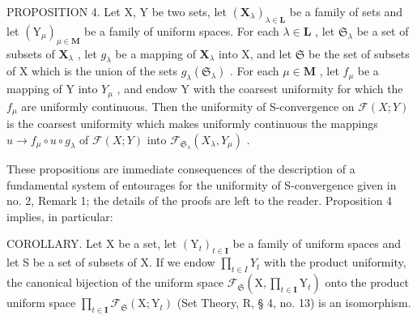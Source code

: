 PROPOSITION 4. Let X, Y be two sets, let \((\mathbf{X}_{\lambda})_{\lambda \in \mathbf{L}}\) be a family of sets and let \((\mathrm{Y}_{\mu})_{\mu \in \mathbf{M}}\) be a family of uniform spaces. For each \(\lambda \in \mathbf{L}\) , let \(\mathfrak{S}_{\lambda}\) be a set of subsets of \(\mathbf{X}_{\lambda}\) , let \(g_{\lambda}\) be a mapping of \(\mathbf{X}_{\lambda}\) into X, and let \(\mathfrak{S}\) be the set of subsets of X which is the union of the sets \(g_{\lambda}(\mathfrak{S}_{\lambda})\) . For each \(\mu \in \mathbf{M}\) , let \(f_{\mu}\) be a mapping of Y into \(Y_{\mu}\) , and endow Y with the coarsest uniformity for which the \(f_{\mu}\) are uniformly continuous. Then the uniformity of S-convergence on \(\mathcal{F}(X;Y)\) is the coarsest uniformity which makes uniformly continuous the mappings \(u \to f_{\mu} \circ u \circ g_{\lambda}\) of \(\mathcal{F}(X;Y)\) into \(\mathcal{F}_{\mathfrak{S}_{\lambda}}(X_{\lambda},Y_{\mu})\) .

These propositions are immediate consequences of the description of a fundamental system of entourages for the uniformity of S-convergence given in no. 2, Remark 1; the details of the proofs are left to the reader. Proposition 4 implies, in particular:

COROLLARY. Let X be a set, let \((\mathrm{Y}_{t})_{t\in\mathbf{I}}\) be a family of uniform spaces and let S be a set of subsets of X. If we endow \(\prod_{t\in I}Y_{t}\) with the product uniformity, the canonical bijection of the uniform space \(\mathcal{F}_{\mathfrak{S}}\left(\mathrm{X},\prod_{t\in\mathbf{I}}\mathrm{Y}_{t}\right)\) onto the product uniform space \(\prod_{t\in\mathbf{I}}\mathcal{F}_{\mathfrak{S}}(\mathrm{X};\mathrm{Y}_{t})\) (Set Theory, R, § 4, no. 13) is an isomorphism.

